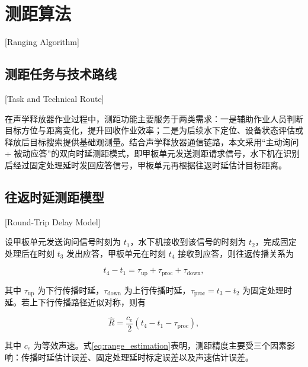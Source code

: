 
%
%

\chapter{测距算法}[Ranging Algorithm]
\label{chap04}

\section{测距任务与技术路线}[Task and Technical Route]

在声学释放器作业过程中，测距功能主要服务于两类需求：一是辅助作业人员判断目标方位与距离变化，提升回收作业效率；二是为后续水下定位、设备状态评估或释放后目标搜索提供基础观测量。结合声学释放器通信链路，本文采用“主动询问 + 被动应答”的双向时延测距模式，即甲板单元发送测距请求信号，水下机在识别后经过固定处理延时发回应答信号，甲板单元再根据往返时延估计目标距离\cite{LiangBoZhongChengShuiXiaCeJuJiYaoKongXiTongZhuKongJiSheJi2009,ZhangMeiKaiJiYuSTM32ChuLiQiDeShuiXiaXinBiaoDeZhuDongCeJuSheJi2016}。

\section{往返时延测距模型}[Round-Trip Delay Model]

设甲板单元发送询问信号时刻为 $t_1$，水下机接收到该信号的时刻为 $t_2$，完成固定处理后在时刻 $t_3$ 发出应答，甲板单元在时刻 $t_4$ 接收到应答，则往返传播关系为

\begin{equation}
  t_4 - t_1 = \tau_{\mathrm{up}} + \tau_{\mathrm{proc}} + \tau_{\mathrm{down}},
  \label{eq:rtt_model}
\end{equation}

其中 $\tau_{\mathrm{up}}$ 为下行传播时延，$\tau_{\mathrm{down}}$ 为上行传播时延，$\tau_{\mathrm{proc}} = t_3 - t_2$ 为固定处理时延。若上下行传播路径近似对称，则有

\begin{equation}
  \hat{R} = \frac{c_e}{2}\left(t_4 - t_1 - \tau_{\mathrm{proc}}\right),
  \label{eq:range_estimation}
\end{equation}

其中 $c_e$ 为等效声速。式\eqref{eq:range_estimation}表明，测距精度主要受三个因素影响：传播时延估计误差、固定处理延时标定误差以及声速估计误差。

